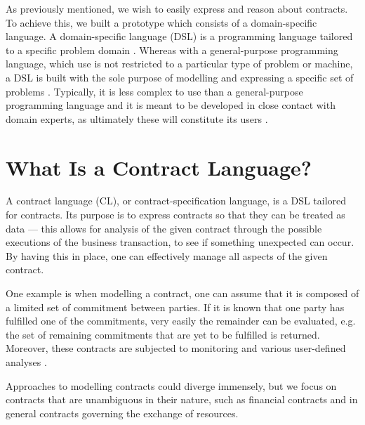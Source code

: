 \documentclass{ituthesis}
\begin{document}
As previously mentioned, we wish to easily express and reason about contracts. To achieve this, we built a prototype which consists of a domain-specific language. A domain-specific language (DSL) is a programming language tailored to a specific problem domain \cite{whatsisadsl2005}. Whereas with a general-purpose programming language, which use is not restricted to a particular type of problem or machine, a DSL is built with the sole purpose of modelling and expressing a specific set of problems \cite{van2000domain}. %
Typically, it is less complex to use than a general-purpose programming language and it is meant to be developed in close contact with domain experts, as ultimately these will constitute its users \cite{dsl}.

\section{What Is a Contract Language?}
A contract language (CL), or contract-specification language, is a DSL tailored for contracts. Its purpose is to express contracts so that they can be treated as data --- this allows for analysis of the given contract through the possible executions of the business transaction, to see if something unexpected can occur. By having this in place, one can effectively manage all aspects of the given contract.

One example is when modelling a contract, one can assume that it is composed of a limited set of commitment between parties. If it is known that one party has fulfilled one of the commitments, very easily the remainder can be evaluated, e.g. the set of remaining commitments that are yet to be fulfilled is returned. Moreover, these contracts are subjected to monitoring and various user-defined analyses \cite{andersen2006compositional}.

Approaches to modelling contracts could diverge immensely, but we focus on contracts that are unambiguous in their nature, such as financial contracts and in general contracts governing the exchange of resources.
\end{document}
